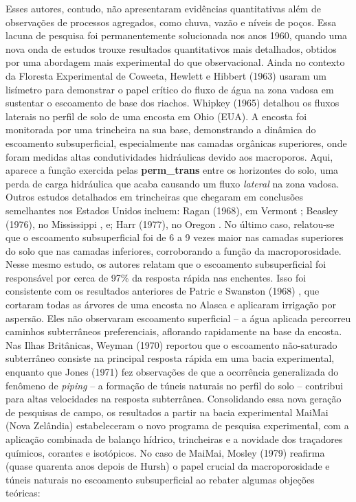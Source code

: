 \documentclass[./main.tex]{subfiles}
\begin{document}
\par Esses autores, contudo, não apresentaram evidências quantitativas além de observações de processos agregados, como chuva, vazão e níveis de poços. Essa lacuna de pesquisa foi permanentemente solucionada nos anos 1960, quando uma nova onda de estudos trouxe resultados quantitativos mais detalhados, obtidos por uma abordagem mais experimental do que observacional. Ainda no contexto da Floresta Experimental de Coweeta, Hewlett e Hibbert (1963) \cite{Hewlett1963} usaram um lisímetro para demonstrar o papel crítico do fluxo de água na zona vadosa em sustentar o escoamento de base dos riachos. Whipkey (1965) \cite{Whipkey1965} detalhou os fluxos laterais no perfil de solo de uma encosta em Ohio (EUA). A encosta foi monitorada por uma trincheira na sua base, demonstrando a dinâmica do escoamento subsuperficial, especialmente nas camadas orgânicas superiores, onde foram medidas altas condutividades hidráulicas devido aos macroporos. Aqui, aparece a função exercida pelas \textbf{\gls{perm_trans}} entre os horizontes do solo, uma perda de carga hidráulica que acaba causando um fluxo \textit{lateral} na zona vadosa. Outros estudos detalhados em trincheiras que chegaram em conclusões semelhantes nos Estados Unidos incluem: Ragan (1968), em Vermont \cite{Ragan1968}; Beasley (1976), no Mississippi \cite{Beasley1976}, e; Harr (1977), no Oregon \cite{Harr1977}. No último caso, relatou-se que o escoamento subsuperficial foi de 6 a 9 vezes maior nas camadas superiores do solo que nas camadas inferiores, corroborando a função da macroporosidade. Nesse mesmo estudo, os autores relatam que o escoamento subsuperficial foi responsável por cerca de 97\% da resposta rápida nas enchentes. Isso foi consistente com os resultados anteriores de Patric e Swanston (1968) \cite{patric1968}, que cortaram todas as árvores de uma encosta no Alasca e aplicaram irrigação por aspersão. Eles não observaram escoamento superficial -- a água aplicada percorreu caminhos subterrâneos preferenciais, aflorando rapidamente na base da encosta. Nas Ilhas Britânicas, Weyman (1970) \cite{weyman1970} reportou que o escoamento não-saturado subterrâneo consiste na principal resposta rápida em uma bacia experimental, enquanto que Jones (1971) \cite{Jones1971} fez observações de que a ocorrência generalizada do fenômeno de \textit{piping} -- a formação de túneis naturais no perfil do solo -- contribui para altas velocidades na resposta subterrânea. Consolidando essa nova geração de pesquisas de campo, os resultados a partir na bacia experimental MaiMai (Nova Zelândia) estabeleceram o novo programa de pesquisa experimental, com a aplicação combinada de balanço hídrico, trincheiras e a novidade dos traçadores químicos, corantes e isotópicos. No caso de MaiMai, Mosley (1979) \cite{Mosley1979} reafirma (quase quarenta anos depois de Hursh) o papel crucial da macroporosidade e túneis naturais no escoamento subsuperficial ao rebater algumas objeções teóricas:
\end{document}
